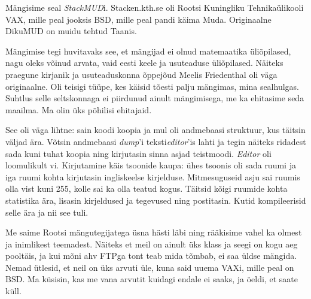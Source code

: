 Mängisime seal \emph{StackMUD}i. Stacken.kth.se oli Rootsi 
Kuningliku Tehnikaülikooli 
VAX, mille peal 
jooksis BSD, mille peal pandi käima Muda. 
Originaalne DikuMUD on muidu tehtud Taanis.

Mängimise tegi huvitavaks see, et mängijad ei olnud matemaatika üliõpilased, 
nagu oleks võinud arvata, vaid eesti keele ja usuteaduse 
üliõpilased. Näiteks praegune kirjanik ja usuteaduskonna õppejõud Meelis 
Friedenthal oli väga originaalne. 
Oli teisigi tüüpe, kes käisid tõesti palju mängimas, mina 
sealhulgas. Suhtlus selle seltskonnaga ei piirdunud ainult 
mängimisega, me ka ehitasime seda maailma. Ma olin üks põhilisi ehitajaid.


See oli väga lihtne: sain koodi koopia ja mul oli andmebaasi struktuur, kus 
täitsin väljad ära. Võtsin andmebaasi \emph{dump}'i 
teksti\emph{editor}'is lahti ja tegin näiteks ridadest sada 
kuni tuhat koopia ning kirjutasin sinna asjad teistmoodi. \emph{Editor} oli loomulikult vi. Kirjutamine käis tsoonide kaupa: ühes tsoonis oli 
sada ruumi ja iga ruumi kohta kirjutasin ingliskeelse kirjelduse. Mitmesuguseid asju sai 
ruumis olla vist kuni 255, kolle sai ka olla teatud
kogus. Täitsid kõigi ruumide kohta statistika ära, lisasin kirjeldused ja
tegevused ning postitasin. Kutid kompileerisid selle ära ja nii see tuli. 

Me saime Rootsi mängutegijatega üsna hästi läbi ning rääkisime 
vahel ka olmest ja inimlikest teemadest. Näiteks et meil on ainult üks klass ja 
seegi on kogu aeg pooltäis, ja kui mõni ahv FTPga tont teab mida tõmbab, ei 
saa üldse mängida. Nemad ütlesid, 
et neil on üks arvuti üle, kuna said uuema VAXi, mille peal on 
BSD. Ma küsisin, kas me vana arvutit kuidagi endale ei 
saaks, ja öeldi, et saate küll. 

